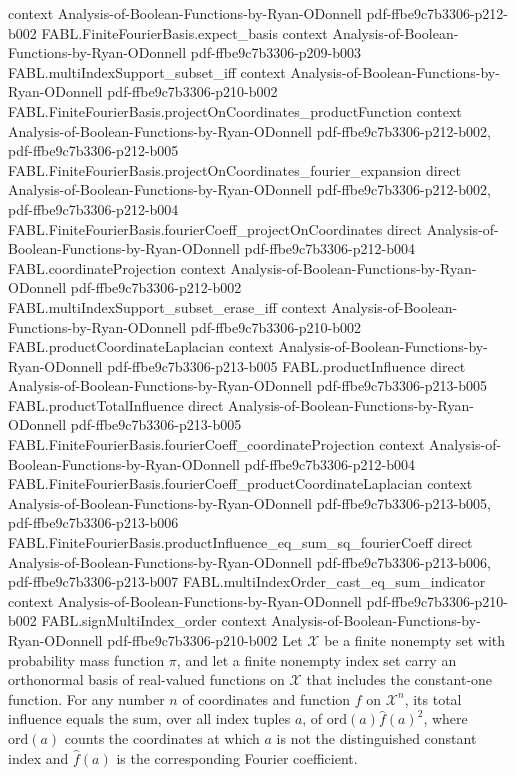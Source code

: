 \begin{theorem}
  {context}
  {Analysis-of-Boolean-Functions-by-Ryan-ODonnell}
  {pdf-ffbe9c7b3306-p212-b002}
\proofstep
  {FABL.FiniteFourierBasis.expect_basis}
  {context}
  {Analysis-of-Boolean-Functions-by-Ryan-ODonnell}
  {pdf-ffbe9c7b3306-p209-b003}
\proofstep
  {FABL.multiIndexSupport_subset_iff}
  {context}
  {Analysis-of-Boolean-Functions-by-Ryan-ODonnell}
  {pdf-ffbe9c7b3306-p210-b002}
\proofstep
  {FABL.FiniteFourierBasis.projectOnCoordinates_productFunction}
  {context}
  {Analysis-of-Boolean-Functions-by-Ryan-ODonnell}
  {pdf-ffbe9c7b3306-p212-b002,
    pdf-ffbe9c7b3306-p212-b005}
\proofstep
  {FABL.FiniteFourierBasis.projectOnCoordinates_fourier_expansion}
  {direct}
  {Analysis-of-Boolean-Functions-by-Ryan-ODonnell}
  {pdf-ffbe9c7b3306-p212-b002,
    pdf-ffbe9c7b3306-p212-b004}
\proofstep
  {FABL.FiniteFourierBasis.fourierCoeff_projectOnCoordinates}
  {direct}
  {Analysis-of-Boolean-Functions-by-Ryan-ODonnell}
  {pdf-ffbe9c7b3306-p212-b004}
\proofstep
  {FABL.coordinateProjection}
  {context}
  {Analysis-of-Boolean-Functions-by-Ryan-ODonnell}
  {pdf-ffbe9c7b3306-p212-b002}
\proofstep
  {FABL.multiIndexSupport_subset_erase_iff}
  {context}
  {Analysis-of-Boolean-Functions-by-Ryan-ODonnell}
  {pdf-ffbe9c7b3306-p210-b002}
\proofstep
  {FABL.productCoordinateLaplacian}
  {context}
  {Analysis-of-Boolean-Functions-by-Ryan-ODonnell}
  {pdf-ffbe9c7b3306-p213-b005}
\proofstep
  {FABL.productInfluence}
  {direct}
  {Analysis-of-Boolean-Functions-by-Ryan-ODonnell}
  {pdf-ffbe9c7b3306-p213-b005}
\proofstep
  {FABL.productTotalInfluence}
  {direct}
  {Analysis-of-Boolean-Functions-by-Ryan-ODonnell}
  {pdf-ffbe9c7b3306-p213-b005}
\proofstep
  {FABL.FiniteFourierBasis.fourierCoeff_coordinateProjection}
  {context}
  {Analysis-of-Boolean-Functions-by-Ryan-ODonnell}
  {pdf-ffbe9c7b3306-p212-b004}
\proofstep
  {FABL.FiniteFourierBasis.fourierCoeff_productCoordinateLaplacian}
  {context}
  {Analysis-of-Boolean-Functions-by-Ryan-ODonnell}
  {pdf-ffbe9c7b3306-p213-b005,
    pdf-ffbe9c7b3306-p213-b006}
\proofstep
  {FABL.FiniteFourierBasis.productInfluence_eq_sum_sq_fourierCoeff}
  {direct}
  {Analysis-of-Boolean-Functions-by-Ryan-ODonnell}
  {pdf-ffbe9c7b3306-p213-b006,
    pdf-ffbe9c7b3306-p213-b007}
\proofstep
  {FABL.multiIndexOrder_cast_eq_sum_indicator}
  {context}
  {Analysis-of-Boolean-Functions-by-Ryan-ODonnell}
  {pdf-ffbe9c7b3306-p210-b002}
\proofstep
  {FABL.signMultiIndex_order}
  {context}
  {Analysis-of-Boolean-Functions-by-Ryan-ODonnell}
  {pdf-ffbe9c7b3306-p210-b002}
Let $\mathcal{X}$ be a finite nonempty set with probability mass function $\pi$, and let
a finite nonempty index set carry an orthonormal basis of real-valued functions on
$\mathcal{X}$ that includes the constant-one function. For any number $n$ of coordinates
and function $f$ on $\mathcal{X}^n$, its total influence equals the sum, over all index
tuples $a$, of $\mathrm{ord}(a)\widehat f(a)^2$, where $\mathrm{ord}(a)$ counts the
coordinates at which $a$ is not the distinguished constant index and $\widehat f(a)$ is
the corresponding Fourier coefficient.
\end{theorem}

